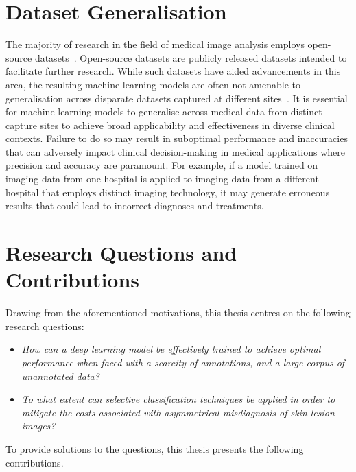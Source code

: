 \section{Dataset Generalisation}
The majority of research in the field of medical image analysis employs open-source datasets~\citep{wu2022skin}. Open-source datasets are publicly released datasets intended to facilitate further research. While such datasets have aided advancements in this area, the resulting machine learning models are often not amenable to generalisation across disparate datasets captured at different sites~\citep{chin2022prepare}. It is essential for machine learning models to generalise across medical data from distinct capture sites to achieve broad applicability and effectiveness in diverse clinical contexts. Failure to do so may result in suboptimal performance and inaccuracies that can adversely impact clinical decision-making in medical applications where precision and accuracy are paramount. For example, if a model trained on imaging data from one hospital is applied to imaging data from a different hospital that employs distinct imaging technology, it may generate erroneous results that could lead to incorrect diagnoses and treatments.



\section{Research Questions and Contributions}
\label{sec:research_contributions}
Drawing from the aforementioned motivations, this thesis centres on the following research questions:

\begin{itemize}
	\item \textit{How can a deep learning model be effectively trained to achieve optimal performance when faced with a scarcity of annotations, and a large corpus of unannotated data?}
	\item \textit{To what extent can selective classification techniques be applied in order to mitigate the costs associated with asymmetrical misdiagnosis of skin lesion images?}
\end{itemize}

\noindent To provide solutions to the questions, this thesis presents the following contributions.

